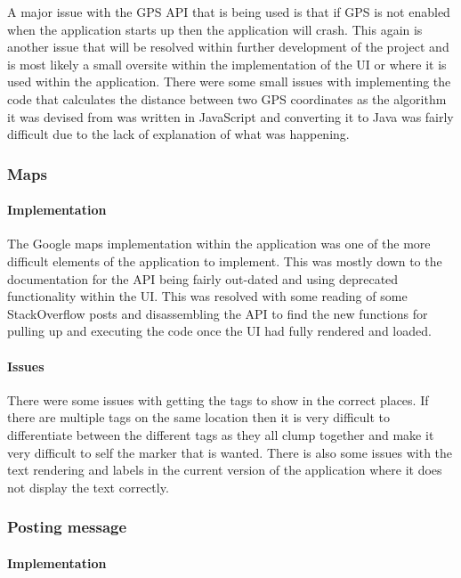 A major issue with the GPS API that is being used is that if GPS is not enabled when the application starts up then the application will crash. This again is another issue that will be resolved within further development of the project and is most likely a small oversite within the implementation of the UI or where it is used within the application. There were some small issues with implementing the code that calculates the distance between two GPS coordinates as the algorithm it was devised from was written in JavaScript and converting it to Java was fairly difficult due to the lack of explanation of what was happening.


\subsubsection*{Maps}

\paragraph*{Implementation}

The Google maps implementation within the application was one of the more difficult elements of the application to implement. This was mostly down to the documentation for the API being fairly out-dated and using deprecated functionality within the UI. This was resolved with some reading of some StackOverflow posts and disassembling the API to find the new functions for pulling up and executing the code once the UI had fully rendered and loaded. 

\paragraph*{Issues}

There were some issues with getting the tags to show in the correct places. If there are multiple tags on the same location then it is very difficult to differentiate between the different tags as they all clump together and make it very difficult to self the marker that is wanted. There is also some issues with the text rendering and labels in the current version of the application where it does not display the text correctly.

\subsubsection*{Posting message}

\paragraph*{Implementation}


